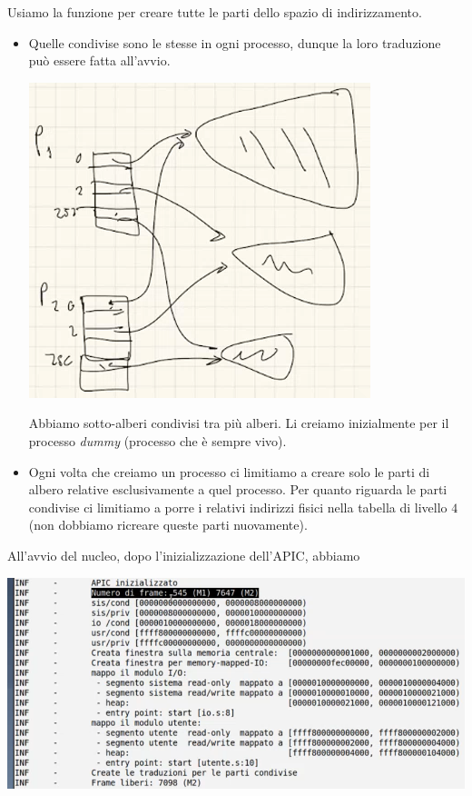 \begin{itemize}
	Usiamo la funzione per creare tutte le parti dello spazio di indirizzamento. 
	\begin{itemize}
		\item Quelle condivise sono le stesse in ogni processo, dunque la loro traduzione può essere fatta all'avvio. 
		\begin{center}
			\includegraphics[scale=.75]{img/265.PNG}
		\end{center}
		Abbiamo sotto-alberi condivisi tra più alberi. Li creiamo inizialmente per il processo \emph{dummy} (processo che è sempre vivo). 
		\item Ogni volta che creiamo un processo ci limitiamo a creare solo le parti di albero relative esclusivamente  a quel processo. Per quanto riguarda le parti condivise ci limitiamo a porre i relativi indirizzi fisici nella tabella di livello $4$ (non dobbiamo ricreare queste parti nuovamente).
	\end{itemize}
	All'avvio del nucleo, dopo l'inizializzazione dell'APIC, abbiamo
	\begin{center}
		\includegraphics[scale=.8]{img/266.PNG}

\end{center}
\end{itemize}
